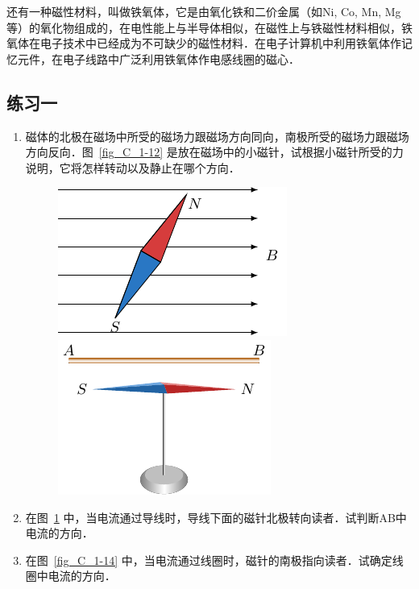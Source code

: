还有一种磁性材料，叫做铁氧体，它是由氧化铁和二价金属（如Ni, Co, Mn, Mg等）的氧化物组成的，在电性能上与半导体相似，在磁性上与铁磁性材料相似，铁氧体在电子技术中已经成为不可缺少的磁性材料．在电子计算机中利用铁氧体作记忆元件，在电子线路中广泛利用铁氧体作电感线圈的磁心．

\subsection*{练习一}
\begin{enumerate}
    \item 磁体的北极在磁场中所受的磁场力跟磁场方向同向，南极所受的磁场力跟磁场方向反向．图~\ref{fig_C_1-12} 是放在磁场中的小磁针，试根据小磁针所受的力说明，它将怎样转动以及静止在哪个方向．
\begin{figure}[htbp]
    \centering
    \begin{minipage}[t]{0.48\textwidth}
        \centering
        \includegraphics{fig/C/1-12.pdf}
        \caption{}\label{fig_C_1-12}
    \end{minipage}
    \begin{minipage}[t]{0.48\textwidth}
        \centering
        \includegraphics{fig/C/1-13.pdf}
        \caption{}\label{fig_C_1-13}
    \end{minipage}
\end{figure}
    \item 在图~\ref{fig_C_1-13} 中，当电流通过导线时，导线下面的磁针北极转向读者．试判断AB中电流的方向．
    \item 在图~\ref{fig_C_1-14} 中，当电流通过线圈时，磁针的南极指向读者．试确定线圈中电流的方向．

\end{enumerate}
